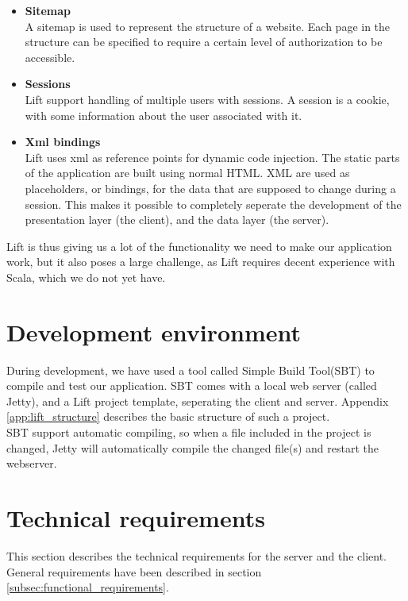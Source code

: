 \begin{itemize}
	\item \textbf{Sitemap}\\
	A sitemap is used to represent the structure of a website. Each page in the structure can be specified to require a certain level of authorization to be accessible. \\
	\item \textbf{Sessions}\\
	Lift support handling of multiple users with sessions. A session is a cookie, with some information about the user associated with it.\\
	\item \textbf{Xml bindings}\\
	Lift uses xml as reference points for dynamic code injection. The static parts of the application are built using normal HTML. XML are used as placeholders, or bindings, for the data that are supposed to change during a session. This makes it possible to completely seperate the development of the presentation layer (the client), and the data layer (the server).
\end{itemize}

Lift is thus giving us a lot of the functionality we need to make our application work, but it also poses a large challenge, as Lift requires decent experience with Scala, which we do not yet have.

\section{Development environment}
\label{sec:development_environment}
During development, we have used a tool called Simple Build Tool(SBT)\cite{sbt} to compile and test our application. SBT comes with a local web server (called Jetty), and a Lift project template, seperating the client and server. Appendix \ref{app:lift_structure} describes the basic structure of such a project.\\
SBT support automatic compiling, so when a file included in the project is changed, Jetty will automatically compile the changed file(s) and restart the webserver.

\section{Technical requirements}
\label{sec:tech_req}
This section describes the technical requirements for the server and the client. General requirements have been described in section \ref{subsec:functional_requirements}.

